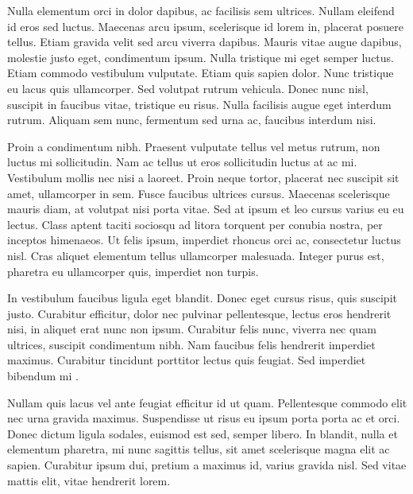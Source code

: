 Nulla elementum orci in dolor dapibus, ac facilisis sem ultrices. Nullam eleifend id eros sed luctus. Maecenas arcu ipsum, scelerisque id lorem in, placerat posuere tellus. Etiam gravida velit sed arcu viverra dapibus. Mauris vitae augue dapibus, molestie justo eget, condimentum ipsum. Nulla tristique mi eget semper luctus. Etiam commodo vestibulum vulputate. Etiam quis sapien dolor. Nunc tristique eu lacus quis ullamcorper. Sed volutpat rutrum vehicula. Donec nunc nisl, suscipit in faucibus vitae, tristique eu risus. Nulla facilisis augue eget interdum rutrum. Aliquam sem nunc, fermentum sed urna ac, faucibus interdum nisi.

Proin a condimentum nibh. Praesent vulputate tellus vel metus rutrum, non luctus mi sollicitudin. Nam ac tellus ut eros sollicitudin luctus at ac mi. Vestibulum mollis nec nisi a laoreet. Proin neque tortor, placerat nec suscipit sit amet, ullamcorper in sem. Fusce faucibus ultrices cursus. Maecenas scelerisque mauris diam, at volutpat nisi porta vitae. Sed at ipsum et leo cursus varius eu eu lectus. Class aptent taciti sociosqu ad litora torquent per conubia nostra, per inceptos himenaeos. Ut felis ipsum, imperdiet rhoncus orci ac, consectetur luctus nisl. Cras aliquet elementum tellus ullamcorper malesuada. Integer purus est, pharetra eu ullamcorper quis, imperdiet non turpis.

In vestibulum faucibus ligula eget blandit. Donec eget cursus risus, quis suscipit justo. Curabitur efficitur, dolor nec pulvinar pellentesque, lectus eros hendrerit nisi, in aliquet erat nunc non ipsum. Curabitur felis nunc, viverra nec quam ultrices, suscipit condimentum nibh. Nam faucibus felis hendrerit imperdiet maximus. Curabitur tincidunt porttitor lectus quis feugiat. Sed imperdiet bibendum mi \cite{HAMEG_USER_MANUAL}.

Nullam quis lacus vel ante feugiat efficitur id ut quam. Pellentesque commodo elit nec urna gravida maximus. Suspendisse ut risus eu ipsum porta porta ac et orci. Donec dictum ligula sodales, euismod est sed, semper libero. In blandit, nulla et elementum pharetra, mi nunc sagittis tellus, sit amet scelerisque magna elit ac sapien. Curabitur ipsum dui, pretium a maximus id, varius gravida nisl. Sed vitae mattis elit, vitae hendrerit lorem. 
